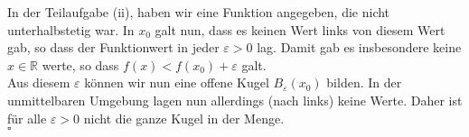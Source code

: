 \documentclass[11pt,a4paper,ngerman]{article}
\begin{document}
\begin{enumerate}[(i)]
			In der Teilaufgabe (ii), haben wir eine Funktion angegeben, die nicht unterhalbstetig war. In $x_0$ galt nun,
			dass es keinen Wert links von diesem Wert gab, so dass der Funktionwert in jeder $\varepsilon > 0$ lag. Damit gab
			es insbesondere keine $x \in \mathbb{R}$ werte, so dass $f(x) < f(x_0) + \varepsilon$ galt.\\

			Aus diesem $\varepsilon$ können wir nun eine offene Kugel $B_\varepsilon(x_0)$ bilden. In der unmittelbaren Umgebung
			lagen nun allerdings (nach links) keine Werte. Daher ist für alle $\varepsilon > 0$ nicht die ganze Kugel in der Menge.\\

		\mbox{} \hfill $\square$
\end{enumerate}
\label{LastPage}
\end{document}
